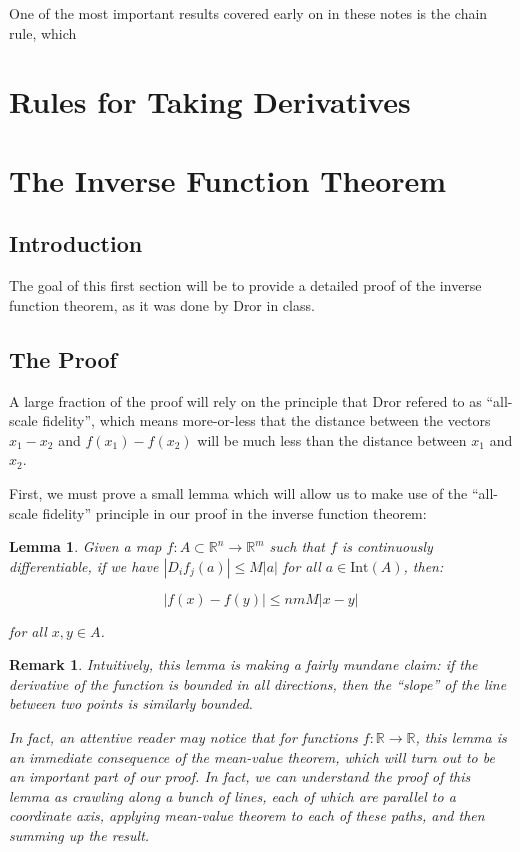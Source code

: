 \documentclass[10pt, oneside]{amsart}
\newtheorem{rem}{Remark}
\newtheorem{lem}{Lemma}
\begin{document}
    One of the most important results covered early on in these notes is the chain rule, which 

    \section{Rules for Taking Derivatives}

    \section{The Inverse Function Theorem}

    \subsection{Introduction}

    The goal of this first section will be to provide a detailed proof of the inverse function theorem, as it was done by Dror in class.

    \subsection{The Proof}

    A large fraction of the proof will rely on the principle that Dror refered to as ``all-scale fidelity'',
    which means more-or-less that the distance between the vectors $x_1 - x_2$ and $f(x_1) - f(x_2)$ will be much less than the distance between $x_1$ and $x_2$.
    \newline

    First, we must prove a small lemma which will allow us to make use of the ``all-scale fidelity'' principle in our proof in the inverse function theorem:

    \begin{lem}
      Given a map $f : A \subset \mathbb{R}^{n} \rightarrow \mathbb{R}^{m}$ such that $f$ is continuously differentiable, if we have $| D_i f_j(a) | \leq M |a|$ for all $a \in \text{Int}(A)$,
      then:

      $$|f(x) - f(y)| \leq nm M |x - y|$$

      for all $x, y \in A$.
    \end{lem}

    \begin{rem}
    Intuitively, this lemma is making a fairly mundane claim: if the derivative of the function is bounded in all directions, then the ``slope'' of the line between two points is similarly bounded.
    \newline

    In fact,
    an attentive reader may notice that for functions $f : \mathbb{R} \rightarrow \mathbb{R}$, this lemma is an immediate consequence of the mean-value theorem, which will turn out to be an important part of our proof.
    In fact, we can understand the proof of this lemma as crawling along a bunch of lines, each of which are parallel to a coordinate axis, applying mean-value theorem to each of these paths, and then summing up the result.
    \end{rem}
\end{document}
